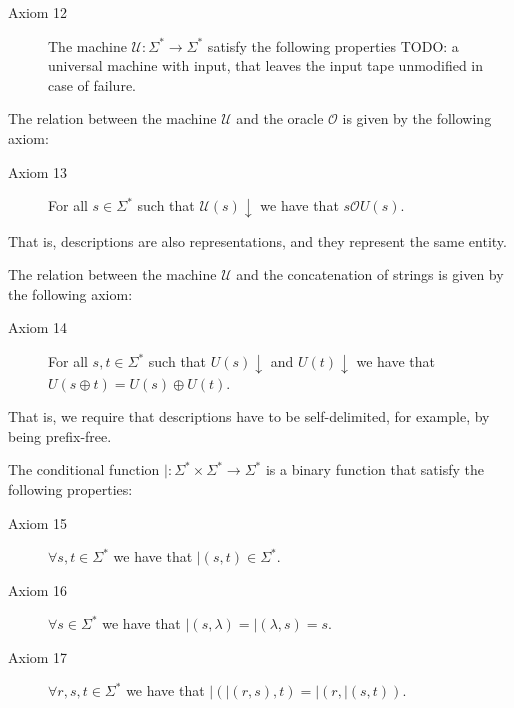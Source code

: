 \vskip 0.25cm

\begin{description}
\item[Axiom 12] The machine $\mathcal{U} : \Sigma^\ast \rightarrow \Sigma^\ast$ satisfy the following properties {\color{red} TODO: a universal machine with input, that leaves the input tape unmodified in case of failure.}
\end{description}

\vskip 0.25cm

The relation between the machine $\mathcal{U}$ and the oracle $\mathcal{O}$ is given by the following axiom:

\vskip 0.25cm

\begin{description}
\item[Axiom 13] For all $s \in \Sigma^\ast$ such that $\mathcal{U}(s) \downarrow$ we have that $s \mathcal{O} U(s)$.
\end{description}

\vskip 0.25cm

That is, descriptions are also representations, and they represent the same entity.

\vskip 0.25cm

The relation between the machine $\mathcal{U}$ and the concatenation of strings is given by the following axiom:

\vskip 0.25cm

\begin{description}
\item[Axiom 14] For all $s, t \in \Sigma^\ast$ such that $U(s) \downarrow$ and $U(t) \downarrow$ we have that $U(s \oplus t) = U(s) \oplus U(t)$.
\end{description}

\vskip 0.25cm

That is, we require that descriptions have to be self-delimited, for example, by being prefix-free.

The conditional function $\mid : \Sigma^\ast \times \Sigma^\ast \rightarrow \Sigma^\ast$ is a binary function that satisfy the following properties:

\vskip 0.25cm

\begin{description}
\item[Axiom 15] $\forall s, t \in \Sigma^\ast$ we have that $\mid(s, t) \in \Sigma^\ast$.
\item[Axiom 16] $\forall s \in \Sigma^\ast$ we have that $\mid (s, \lambda) = \mid( \lambda, s) = s$.
\item[Axiom 17] $\forall r, s, t \in \Sigma^\ast$ we have that $\mid (\mid (r, s), t) = \mid (r, \mid (s, t))$.
\end{description}

